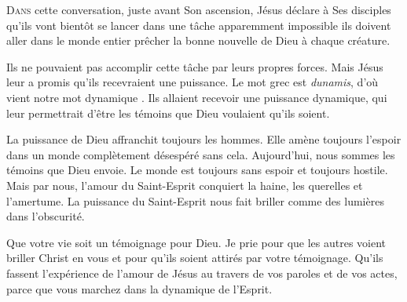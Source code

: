 


\lettrine{D}{ans} cette conversation, juste avant Son ascension,
 Jésus déclare à Ses disciples qu'ils vont bientôt se lancer
 dans une tâche apparemment impossible\frcolon{}
 ils doivent aller dans le monde entier prêcher la bonne nouvelle
 de Dieu à chaque créature.

Ils ne pouvaient pas accomplir cette tâche par leurs propres forces.
 Mais Jésus leur a promis qu'ils recevraient une puissance.
 Le mot grec est \emph{dunamis}, d'où vient notre mot \Og dynamique \Fg{}.
 Ils allaient recevoir une puissance dynamique, qui leur permettrait
 d'être les témoins que Dieu voulaient qu'ils soient.


La puissance de Dieu affranchit toujours les hommes.
 Elle amène toujours l'espoir dans un monde complètement désespéré
 sans cela. Aujourd'hui, nous sommes les témoins que Dieu envoie.
 Le monde est toujours sans espoir et toujours hostile. Mais par nous,
 l'amour du Saint-Esprit conquiert la haine, les querelles et l'amertume.
 La puissance du Saint-Esprit nous fait briller
 comme des lumières dans l'obscurité.

Que votre vie soit un témoignage pour Dieu.
 Je prie pour que les autres voient briller Christ en vous
 et pour qu'ils soient attirés par votre témoignage.
 Qu'ils fassent l'expérience de l'amour de Jésus au travers de vos paroles
 et de vos actes, parce que vous marchez dans la dynamique de l'Esprit.

\dvrule






